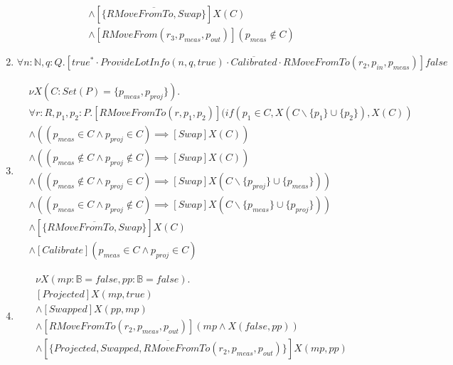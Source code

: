\begin{enumerate}
\begin{align*}
            &\wedge [\overline{\{RMoveFromTo, Swap\}}]X(C)\\
            &\wedge [RMoveFrom(r_3,p_\mathit{meas}, p_\mathit{out})](p_\mathit{meas} \notin C)
        \end{align*}
    \item $\forall n:\mathbb{N},q:Q.[true^{*}\cdot ProvideLotInfo(n,q,true)\cdot \overline{Calibrated}\cdot RMoveFromTo(r_2, p_\mathit{in}, p_\mathit{meas})]false$
    \item \begin{align*}
    		&\nu X(C : Set(P) = \{p_\mathit{meas},p_\mathit{proj}\}).\\
            & \forall r:R, p_1, p_2 : P . [RMoveFromTo(r, p_1, p_2)](if(p_1 \in C, X(C\backslash\{p_1\}\cup\{p_2\}), X(C))\\
            &\wedge ((p_\mathit{meas} \in C \wedge p_\mathit{proj} \in C) \implies [Swap]X(C))\\
            &\wedge ((p_\mathit{meas} \notin C \wedge p_\mathit{proj} \notin C) \implies [Swap]X(C))\\
            &\wedge ((p_\mathit{meas} \notin C \wedge p_\mathit{proj} \in C) \implies [Swap]X(C\backslash\{p_\mathit{proj}\} \cup \{p_\mathit{meas}\}))\\
            &\wedge ((p_\mathit{meas} \in C \wedge p_\mathit{proj} \notin C) \implies [Swap]X(C\backslash\{p_\mathit{meas}\} \cup \{p_\mathit{proj}\}))\\
            &\wedge [\overline{\{RMoveFromTo, Swap\}}]X(C)\\
            &\wedge [Calibrate](p_\mathit{meas} \in C \wedge p_\mathit{proj} \in C)
        \end{align*}
    \item \begin{align*}
    	&\nu X(mp:\mathbb{B} = false, pp:\mathbb{B}=false).\\
    	&[Projected]X(mp, true)\\
    	&\wedge [Swapped]X(pp, mp)\\
    	&\wedge [RMoveFromTo(r_2, p_\mathit{meas}, p_\mathit{out})](mp \wedge X(false, pp))\\
    	&\wedge [\overline{\{Projected, Swapped, RMoveFromTo(r_2, p_\mathit{meas}, p_\mathit{out})\}}]X(mp, pp)
    \end{align*}
\end{enumerate}